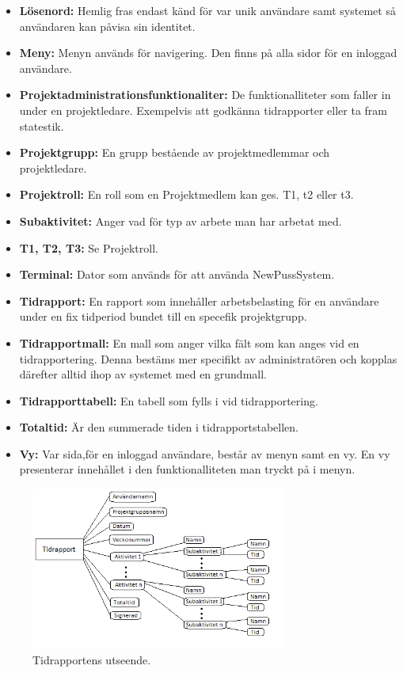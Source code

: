 \documentclass[a4paper]{article}
\begin{document}
\begin{itemize}
\item [] \textbf{Lösenord:} Hemlig fras endast känd för var unik användare samt systemet så användaren kan påvisa sin identitet.
\item [] \textbf{Meny:} Menyn används för navigering. Den finns på alla sidor för en inloggad användare.
\item [] \textbf{Projektadministrationsfunktionaliter:} De funktionalliteter som faller in under en projektledare. Exempelvis att godkänna tidrapporter eller ta fram statestik.
\item [] \textbf{Projektgrupp:} En grupp bestående av projektmedlemmar och projektledare.
\item [] \textbf{Projektroll:} En roll som en Projektmedlem kan ges. T1, t2 eller t3.
\item [] \textbf{Subaktivitet:} Anger vad för typ av arbete man har arbetat med.
\item [] \textbf{T1, T2, T3:} Se Projektroll.
\item [] \textbf{Terminal:} Dator som används för att använda NewPussSystem.
\item [] \textbf{Tidrapport:} En rapport som innehåller arbetsbelasting för en användare under en fix tidperiod bundet till en specefik projektgrupp.
\item [] \textbf{Tidrapportmall:} En mall som anger vilka fält som kan anges vid en tidrapportering. Denna bestäms mer specifikt av administratören och kopplas därefter alltid ihop av systemet med en grundmall.
\item [] \textbf{Tidrapporttabell:} En tabell som fylls i vid tidrapportering. 
\item [] \textbf{Totaltid:} Är den summerade tiden i tidrapportstabellen. 
\item [] \textbf{Vy:} Var sida,för en inloggad användare, består av menyn samt en vy. En vy presenterar innehållet i den funktionalliteten man tryckt på i menyn.
\end{itemize}
			\begin{figure}[h!]
				\centering
				\includegraphics[width=0.75\textwidth]{Tidrapport_Modell}
				\caption{Tidrapportens utseende.}
				\label{image_gen_tidrapport}
			\end{figure}
\end{document}
